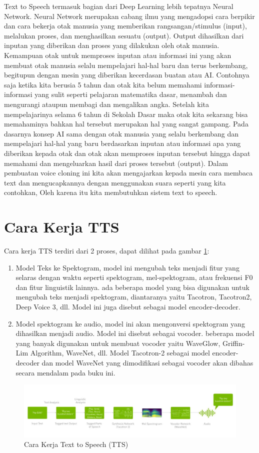 Text to Speech termasuk bagian dari Deep Learning lebih tepatnya Neural Network\cite{li2017deep}. Neural Network merupakan cabang ilmu yang mengadopsi cara berpikir dan cara bekerja otak manusia yang memberikan rangsangan/stimulus (input), melalukan proses, dan menghasilkan sesuatu (output). Output dihasilkan dari inputan yang diberikan dan proses yang dilakukan oleh otak manusia. Kemampuan otak untuk memproses inputan atau informasi ini yang akan membuat otak manusia selalu mempelajari hal-hal baru dan terus berkembang, begitupun dengan mesin yang diberikan kecerdasan buatan atau AI. Contohnya saja ketika kita berusia 5 tahun dan otak kita belum memahami informasi-informasi yang sulit seperti pelajaran matematika dasar, menambah dan mengurangi ataupun membagi dan mengalikan angka. Setelah kita mempelajarinya selama 6 tahun di Sekolah Dasar maka otak kita sekarang bisa memahaminya bahkan hal tersebut merupakan hal yang sangat gampang. Pada dasarnya konsep AI sama dengan otak manusia yang selalu berkembang dan mempelajari hal-hal yang baru berdasarkan inputan atau informasi apa yang diberikan kepada otak dan otak akan memproses inputan tersebut hingga dapat memahami dan mengeluarkan hasil dari proses tersebut (output).
Dalam pembuatan voice cloning ini kita akan mengajarkan kepada mesin cara membaca text dan mengucapkannya dengan menggunakan suara seperti yang kita contohkan, Oleh karena itu kita membutuhkan sistem text to speech.


\section{Cara Kerja TTS}
Cara kerja TTS terdiri dari 2 proses, dapat dilihat pada gambar \ref{cara kerja}:
\begin{enumerate}
\item Model Teks ke Spektogram, model ini mengubah teks menjadi fitur yang selaras dengan waktu seperti spektogram, mel-spektogram, atau frekuensi F0 dan fitur linguistik lainnya. ada beberapa model yang bisa digunakan untuk mengubah teks menjadi spektogram, diantaranya yaitu Tacotron, Tacotron2, Deep Voice 3, dll. Model ini juga disebut sebagai model encoder-decoder.
\item Model spektogram ke audio, model ini akan mengonversi spektogram yang dihasilkan menjadi audio. Model ini disebut sebagai vocoder. beberapa model yang banyak digunakan untuk membuat vocoder yaitu WaveGlow, Griffin-Lim Algorithm, WaveNet, dll.
Model Tacotron-2 sebagai model encoder-decoder dan model WaveNet yang dimodifikasi sebagai vocoder akan dibahas secara mendalam pada buku ini.
\end{enumerate}
\begin{figure}[H]
        \centerline{\includegraphics[scale=.40]{figures/cara_kerja_tts}}
        \caption{Cara Kerja Text to Speech (TTS)}
		\label{cara kerja}
\end{figure}
